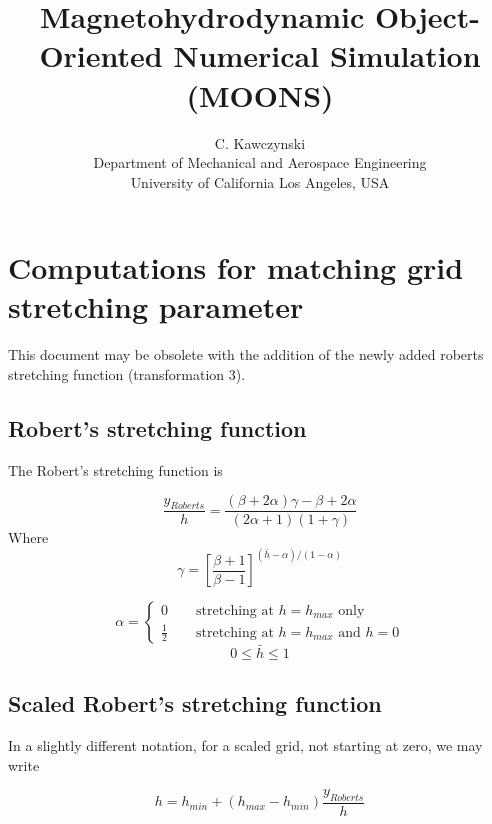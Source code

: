 \documentclass[11pt]{article}
\begin{document}
\doublespacing
\title{Magnetohydrodynamic Object-Oriented Numerical Simulation (MOONS)}
\author{C. Kawczynski \\
Department of Mechanical and Aerospace Engineering \\
University of California Los Angeles, USA\\
}
\maketitle

\section{Computations for matching grid stretching parameter}

This document may be obsolete with the addition of the newly added roberts stretching function (transformation 3).

\subsection{Robert's stretching function}
The Robert's stretching function is

\begin{equation}
	\frac{y_{Roberts}}{h} = \frac{(\beta+2\alpha)\gamma - \beta + 2\alpha}{(2\alpha+1)(1+\gamma)}
\end{equation}
Where
\begin{equation}
	\gamma = \left[ 
	\frac{\beta+1}{\beta-1}
	\right]^{(\bar{h}-\alpha)/(1-\alpha)}
\end{equation}

\begin{equation}
	\alpha = 
	\begin{cases}
	0 \qquad \text{stretching at $h=h_{max}$ only}
	\\
	\frac{1}{2} \qquad \text{stretching at $h=h_{max}$ and $h=0$}
	\end{cases}
\end{equation}
\begin{equation}
	0 \le \bar{h} \le 1
\end{equation}


\subsection{Scaled Robert's stretching function}
In a slightly different notation, for a scaled grid, not starting at zero, we may write

\begin{equation}
	h = h_{min} + (h_{max}-h_{min}) \frac{y_{Roberts}}{h}
\end{equation}
\end{document}
